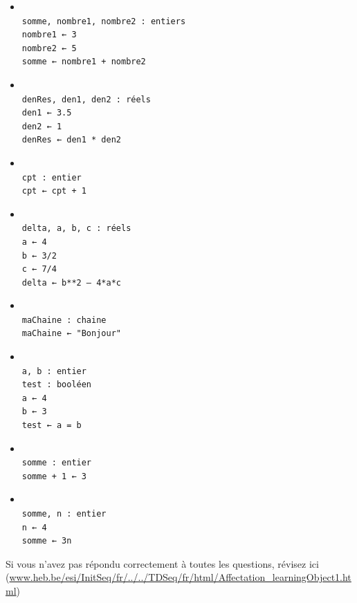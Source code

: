 \documentclass[11pt,a4paper]{article}
\begin{document}
            \begin{itemize} 
        
            \item[ \ding{"6F} ] \begin{verbatim}

somme, nombre1, nombre2 : entiers 
nombre1 ← 3 
nombre2 ← 5 
somme ← nombre1 + nombre2\end{verbatim}
        
            \item[ \ding{"6F} ] \begin{verbatim}

denRes, den1, den2 : réels 
den1 ← 3.5 
den2 ← 1 
denRes ← den1 * den2\end{verbatim}
        
            \item[ \ding{"6F} ] \begin{verbatim}
						
cpt : entier 
cpt ← cpt + 1\end{verbatim}
        
            \item[ \ding{"6F} ] \begin{verbatim}
						
delta, a, b, c : réels 
a ← 4 
b ← 3/2 
c ← 7/4 
delta ← b**2 – 4*a*c\end{verbatim}
        
            \item[ \ding{"6F} ] \begin{verbatim}
						
maChaine : chaine 
maChaine ← "Bonjour"\end{verbatim}
        
            \item[ \ding{"6F} ] \begin{verbatim}
						
a, b : entier 
test : booléen 
a ← 4 
b ← 3 
test ← a = b\end{verbatim}
        
            \item[ \ding{"6F} ] \begin{verbatim}
						
somme : entier 
somme + 1 ← 3\end{verbatim}
        
            \item[ \ding{"6F} ] \begin{verbatim}
						
somme, n : entier 
n ← 4 
somme ← 3n\end{verbatim}
        
            \end{itemize} 
        Si vous n'avez pas r\'epondu correctement \`a toutes les questions, 
        r\'evisez ici (\url{www.heb.be/esi/InitSeq/fr/../../TDSeq/fr/html/Affectation\_learningObject1.html})
            \par
\end{document}
